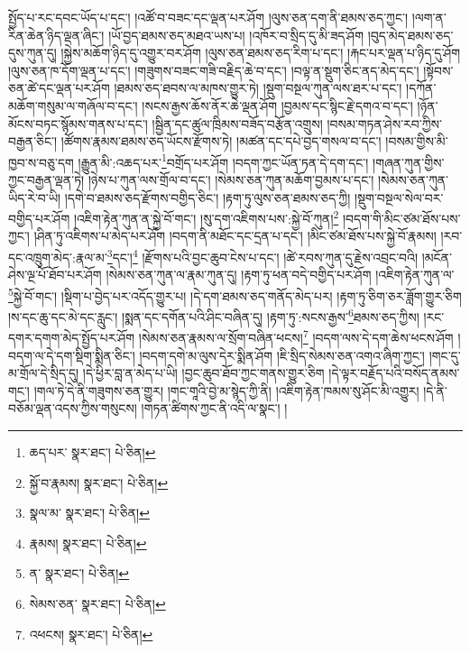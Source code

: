 སྤྱོད་པ་རང་དབང་ཡོད་པ་དང་། །འཚོ་བ་བཟང་དང་ལྡན་པར་ཤོག །ལུས་ཅན་དག་ནི་ཐམས་ཅད་ཀྱང་། །ལག་ན་རིན་ཆེན་ཉིད་ལྡན་ཞིང་། །ཡོ་བྱད་ཐམས་ཅད་མཐའ་ཡས་པ། །འཁོར་བ་སྲིད་དུ་མི་ཟད་ཤོག །བུད་མེད་ཐམས་ཅད་དུས་ཀུན་དུ། །སྐྱེས་མཆོག་ཉིད་དུ་འགྱུར་བར་ཤོག །ལུས་ཅན་ཐམས་ཅད་རིག་པ་དང་། །རྐང་པར་ལྡན་པ་ཉིད་དུ་ཤོག །ལུས་ཅན་ཁ་དོག་ལྡན་པ་དང་། །གཟུགས་བཟང་གཟི་བརྗིད་ཆེ་བ་དང་། །བལྟ་ན་སྡུག་ཅིང་ནད་མེད་དང་། །སྟོབས་ཅན་ཚེ་དང་ལྡན་པར་ཤོག །ཐམས་ཅད་ཐབས་ལ་མཁས་གྱུར་ཏེ། །སྡུག་བསྔལ་ཀུན་ལས་ཐར་པ་དང་། །དཀོན་མཆོག་གསུམ་ལ་གཞོལ་བ་དང་། །སངས་རྒྱས་ཆོས་ནོར་ཆེ་ལྡན་ཤོག །བྱམས་དང་སྙིང་རྗེ་དགའ་བ་དང་། །ཉོན་མོངས་བཏང་སྙོམས་གནས་པ་དང་། །སྦྱིན་དང་ཚུལ་ཁྲིམས་བཟོད་བརྩོན་འགྲུས། །བསམ་གཏན་ཤེས་རབ་ཀྱིས་བརྒྱན་ཅིང་། །ཚོགས་རྣམས་ཐམས་ཅད་ཡོངས་རྫོགས་ཏེ། །མཚན་དང་དཔེ་བྱད་གསལ་བ་དང་། །བསམ་གྱིས་མི་ཁྱབ་ས་བཅུ་དག །རྒྱུན་མི་:འཆད་པར་\footnote{ཆད་པར་  སྣར་ཐང་།  པེ་ཅིན། }བགྲོད་པར་ཤོག །བདག་ཀྱང་ཡོན་ཏན་དེ་དག་དང་། །གཞན་ཀུན་གྱིས་ཀྱང་བརྒྱན་ལྡན་ཏེ། །ཉེས་པ་ཀུན་ལས་གྲོལ་བ་དང་། །སེམས་ཅན་ཀུན་མཆོག་བྱམས་པ་དང་། །སེམས་ཅན་ཀུན་ཡིད་རེ་བ་ཡི། །དགེ་བ་ཐམས་ཅད་རྫོགས་བགྱིད་ཅིང་། །རྟག་ཏུ་ལུས་ཅན་ཐམས་ཅད་ཀྱི། །སྡུག་བསྔལ་སེལ་བར་བགྱིད་པར་ཤོག །འཇིག་རྟེན་ཀུན་ན་སྐྱེ་བོ་གང་། །སུ་དག་འཇིགས་པས་:སྐྱེ་བོ་ཀུན།\footnote{སྐྱོ་བ་རྣམས།  སྣར་ཐང་།  པེ་ཅིན། } །བདག་གི་མིང་ཙམ་ཐོས་པས་ཀྱང་། །ཤིན་ཏུ་འཇིགས་པ་མེད་པར་ཤོག །བདག་ནི་མཐོང་དང་དྲན་པ་དང་། །མིང་ཙམ་ཐོས་པས་སྐྱེ་བོ་རྣམས། །རབ་དང་འཁྲུག་མེད་:རྣལ་མ་\footnote{སྣལ་མ་  སྣར་ཐང་།  པེ་ཅིན། }དང་།\footnote{རྣམས།  སྣར་ཐང་།  པེ་ཅིན། } །རྫོགས་པའི་བྱང་ཆུབ་ངེས་པ་དང་། །ཚེ་རབས་ཀུན་དུ་རྗེས་འབྲང་བའི། །མངོན་ཤེས་ལྔ་པོ་ཐོབ་པར་ཤོག །སེམས་ཅན་ཀུན་ལ་རྣམ་ཀུན་དུ། །རྟག་ཏུ་ཕན་བདེ་བགྱིད་པར་ཤོག །འཇིག་རྟེན་ཀུན་ལ་\footnote{ན་  སྣར་ཐང་།  པེ་ཅིན། }སྐྱེ་བོ་གང་། །སྡིག་པ་བྱེད་པར་འདོད་གྱུར་པ། །དེ་དག་ཐམས་ཅད་གནོད་མེད་པར། །རྟག་ཏུ་ཅིག་ཅར་ཟློག་གྱུར་ཅིག །ས་དང་ཆུ་དང་མེ་དང་རླུང་། །སྨན་དང་དགོན་པའི་ཤིང་བཞིན་དུ། །རྟག་ཏུ་:སངས་རྒྱས་\footnote{སེམས་ཅན་  སྣར་ཐང་།  པེ་ཅིན། }ཐམས་ཅད་ཀྱིས། །རང་དགར་དགག་མེད་སྤྱོད་པར་ཤོག །སེམས་ཅན་རྣམས་ལ་སྲོག་བཞིན་ཕངས།\footnote{འཕངས།  སྣར་ཐང་།  པེ་ཅིན། } །བདག་ལས་དེ་དག་ཆེས་ཕངས་ཤོག །བདག་ལ་དེ་དག་སྡིག་སྨིན་ཅིང་། །བདག་དགེ་མ་ལུས་དེར་སྨིན་ཤོག །ཇི་སྲིད་སེམས་ཅན་འགའ་ཞིག་ཀྱང་། །གང་དུ་མ་གྲོལ་དེ་སྲིད་དུ། །དེ་ཕྱིར་བླ་ན་མེད་པ་ཡི། །བྱང་ཆུབ་ཐོབ་ཀྱང་གནས་གྱུར་ཅིག །དེ་ལྟར་བརྗོད་པའི་བསོད་ནམས་གང་། །གལ་ཏེ་དེ་ནི་གཟུགས་ཅན་གྱུར། །གང་གཱའི་བྱེ་མ་སྙེད་ཀྱི་ནི། །འཇིག་རྟེན་ཁམས་སུ་ཤོང་མི་འགྱུར། །དེ་ནི་བཅོམ་ལྡན་འདས་ཀྱིས་གསུངས། །གཏན་ཚིགས་ཀྱང་ནི་འདི་ལ་སྣང་། །
